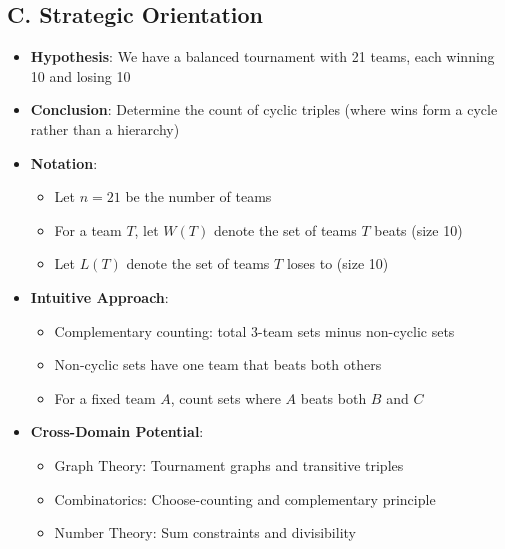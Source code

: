 \documentclass[]{article}
\begin{document}
\begin{problemconfigbox}
\subsection*{C. Strategic Orientation}
\begin{itemize}[leftmargin=*]
    \item \textbf{Hypothesis}: We have a balanced tournament with 21 teams, each winning 10 and losing 10
    \item \textbf{Conclusion}: Determine the count of cyclic triples (where wins form a cycle rather than a hierarchy)
    \item \textbf{Notation}: 
    \begin{itemize}
        \item Let $n = 21$ be the number of teams
        \item For a team $T$, let $W(T)$ denote the set of teams $T$ beats (size 10)
        \item Let $L(T)$ denote the set of teams $T$ loses to (size 10)
    \end{itemize}
    \item \textbf{Intuitive Approach}: 
    \begin{itemize}
        \item Complementary counting: total 3-team sets minus non-cyclic sets
        \item Non-cyclic sets have one team that beats both others
        \item For a fixed team $A$, count sets where $A$ beats both $B$ and $C$
    \end{itemize}
    \item \textbf{Cross-Domain Potential}: 
    \begin{itemize}
        \item Graph Theory: Tournament graphs and transitive triples
        \item Combinatorics: Choose-counting and complementary principle
        \item Number Theory: Sum constraints and divisibility
    \end{itemize}
\end{itemize}
\end{problemconfigbox}
\end{document}
